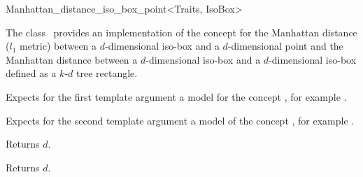 

\begin{ccRefClass}{Manhattan_distance_iso_box_point<Traits, IsoBox>}  %


\ccDefinition
  
The class \ccRefName\ provides an implementation of
the  concept
for the Manhattan distance ($l_1$ metric)
between a $d$-dimensional iso-box and a $d$-dimensional point 
and the Manhattan distance between a $d$-dimensional iso-box
and a $d$-dimensional iso-box defined as a $k$-$d$ tree rectangle.


\ccParameters
Expects for the first template argument
a model for the concept , for example .

Expects for the second template argument a model
of the concept ,
for example .


\ccIsModel


\ccTypes


\ccCreation
{}  %


\ccOperations

 {Returns $d$.}

 {Returns $d$.}


\end{ccRefClass}
